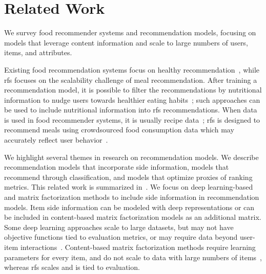 
\section{Related Work}
We survey food recommender systems and recommendation models, focusing on models that leverage content information and scale to large numbers of users, items, and attributes.

Existing food recommendation systems focus on healthy recommendation~\citep{trattner2019an-evaluation,freyne2011recipe,khan2019personalized,yang2017yum-me:}, while \gls{rfs} focuses on the scalability challenge of meal recommendation. After training a recommendation model, it is possible to filter the recommendations by nutritional information to nudge users towards healthier eating habits~\citep{elsweiler2017exploiting}; such approaches can be used to include nutritional information into \gls{rfs} recommendations. When data is used in food recommender systems, it is usually recipe data~\citep{trattner2017food}; \gls{rfs} is designed to recommend meals using crowdsourced food consumption data which may accurately reflect user behavior~\citep{trattner2019what}.

We highlight several themes in research on recommendation models. We describe recommendation models that incorporate side information, models that recommend through classification, and models that optimize proxies of ranking metrics. This related work is summarized in~. We focus on deep learning-based and matrix factorization methods to include side information in recommendation models. Item side information can be modeled with deep representations or can be included in content-based matrix factorization models as an additional matrix. Some deep learning approaches scale to large datasets, but may not have objective functions tied to evaluation metrics, or may require data beyond user-item interactions~\citep{okura2017embedding-based}. Content-based matrix factorization methods require learning parameters for every item, and do not scale to data with large numbers of items~\citep{wang2011collaborative,gopalan2014content-based}, whereas \gls{rfs} scales and is tied to evaluation.

